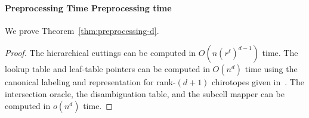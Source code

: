 \paragraph*{\iftitlecase%
Preprocessing Time\else%
Preprocessing time\fi}
We prove Theorem~\ref{thm:preprocessing-d}.
\begin{proof}
  The hierarchical cuttings can be computed in \(O(n{(r^\ell)}^{d-1})\) time.
  The lookup table and leaf-table pointers can be computed in \(O(n^d)\) time
  using the canonical labeling and representation for rank-\((d+1)\) chirotopes
  given in~\cite{AILOW14}. The intersection oracle, the disambiguation table,
  and the subcell mapper can be computed in \(o(n^{d})\) time.
\end{proof}
